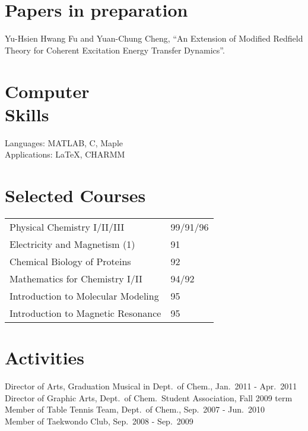 \documentclass[margin,line, 11pt, a4paper]{res}
\begin{document}
\begin{resume}
\section{\sc Papers in preparation}

Yu-Hsien Hwang Fu and Yuan-Chung Cheng, ``An Extension of Modified Redfield Theory for Coherent Excitation Energy Transfer Dynamics''.

\section{\sc Computer \\ Skills} 
Languages:  MATLAB, C, Maple \\
Applications: \LaTeX, CHARMM\\

\vspace*{-1.5ex}

\section{\sc Selected Courses}
\begin{tabular}{@{}p{2.4in}p{4in}}
 Physical Chemistry I/II/III                & 99/91/96 \\
 Electricity and Magnetism (1)          & 91 \\
 Chemical Biology of Proteins           &92 \\
 Mathematics for Chemistry I/II        &94/92 \\
 Introduction to Molecular Modeling & 95 \\
 Introduction to Magnetic Resonance & 95 \\
\end{tabular}

\section{ Activities}
Director of Arts, Graduation Musical in Dept.~of Chem., Jan.~2011 - Apr.~2011\\
Director of Graphic Arts, Dept.~of Chem.~Student Association, Fall 2009 term\\
Member of Table Tennis Team, Dept.~of Chem., Sep.~2007 - Jun.~2010\\
Member of Taekwondo Club, Sep.~2008 - Sep.~2009\\

\end{resume}
\end{document}
